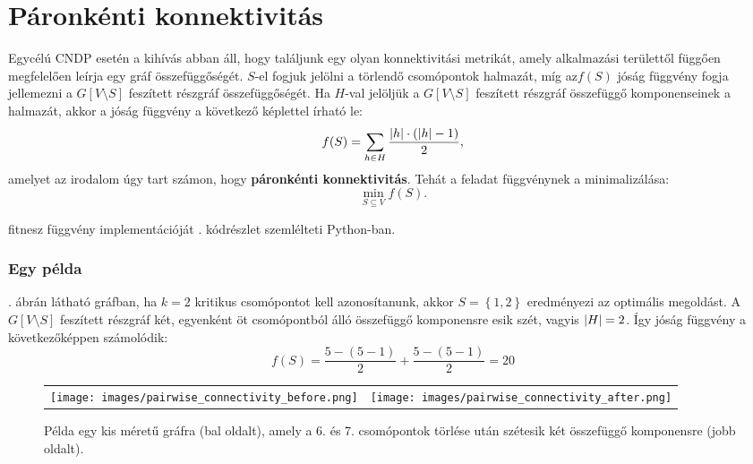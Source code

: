 \section{Páronkénti konnektivitás}\label{sec:PAIRWISE_CONNECTIVITY}
Egycélú CNDP esetén a kihívás abban áll, hogy találjunk egy olyan konnektivitási metrikát,
amely alkalmazási területtől függően megfelelően leírja egy gráf összefüggőségét.
$S$-el fogjuk jelölni a törlendő csomópontok halmazát,
míg az$f(S)$ jóság függvény fogja jellemezni a $G[V \setminus S]$ feszített részgráf összefüggőségét.
Ha $H$-val jelöljük a $G[V \setminus S]$ feszített részgráf összefüggő komponenseinek a halmazát,
akkor a jóság függvény a következő képlettel írható le:
\begin{equation}\label{eqn:PAIRWISE_CONNECTIVITY}
  f(S) = \sum_{h \in H} \frac{\lvert h\rvert \cdot (\lvert h\rvert - 1)}{2},
\end{equation}
amelyet az irodalom \cite{ventresca2012global, aringhieri2016general} úgy tart számon,
hogy \textbf{páronkénti konnektivitás}.
Tehát a feladat  függvénynek a minimalizálása:
\begin{equation}\label{eqn:MIN_PAIRWISE_CONNECTIVITY}
  \min_{S \subseteq V} f(S).
\end{equation}

 fitnesz függvény implementációját . kódrészlet szemlélteti Python-ban.



\subsubsection{Egy példa}
. ábrán látható gráfban,
ha $k = 2$ kritikus csomópontot kell azonosítanunk,
akkor $S = \left\{ 1, 2 \right\}$ eredményezi az optimális megoldást.
A $G\left[ V \setminus S \right]$ feszített részgráf két, egyenként öt csomópontból álló összefüggő komponensre esik szét,
vagyis $\lvert H\rvert = 2$. Így  jóság függvény a következőképpen számolódik:
\[
  f(S) = \dfrac{5 - (5 - 1)}{2} + \dfrac{5 - (5 - 1)}{2} = 20
\]

\begin{figure}[h]
  \centering
  \begin{tabular}{ll}
    \texttt{[image: images/pairwise\_connectivity\_before.png]}
     &
    \texttt{[image: images/pairwise\_connectivity\_after.png]}
  \end{tabular}
  \caption{
    Példa egy kis méretű gráfra (bal oldalt), amely a 6. és 7. csomópontok törlése után
    szétesik két összefüggő komponensre (jobb oldalt).
  }
  \label{fig:PAIRWISE_CONNECTIVITY_EXAMPLE}
\end{figure}
